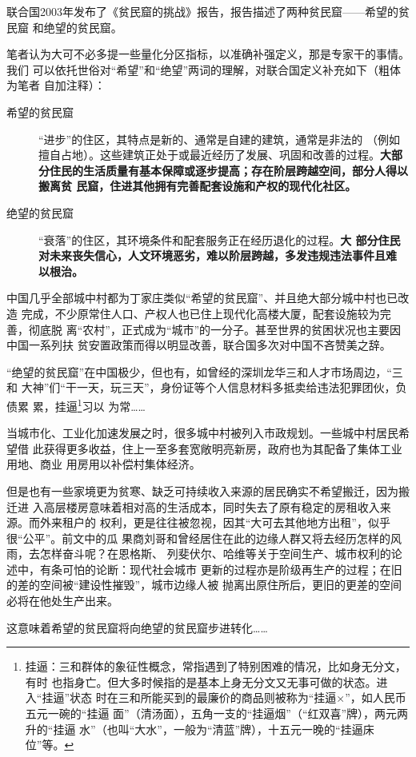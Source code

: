 联合国2003年发布了《贫民窟的挑战》报告，报告描述了两种贫民窟——希望的贫民窟
和绝望的贫民窟。

笔者认为大可不必多提一些量化分区指标，以准确补强定义，那是专家干的事情。我们
可以依托世俗对“希望”和“绝望”两词的理解，对联合国定义补充如下（粗体为笔者
自加注释）：
\begin{description}
\item[希望的贫民窟] “进步”的住区，其特点是新的、通常是自建的建筑，通常是非法的
  （例如擅自占地）。这些建筑正处于或最近经历了发展、巩固和改善的过程。\textbf{大部
    分住民的生活质量有基本保障或逐步提高；存在阶层跨越空间，部分人得以搬离贫
    民窟，住进其他拥有完善配套设施和产权的现代化社区。}
\item[绝望的贫民窟] “衰落”的住区，其环境条件和配套服务正在经历退化的过程。\textbf{大
    部分住民对未来丧失信心，人文环境恶劣，难以阶层跨越，多发违规违法事件且难
    以根治。}
\end{description}

中国几乎全部城中村都为丁家庄类似“希望的贫民窟”、并且绝大部分城中村也已改造
完成，不少原常住人口、产权人也已住上现代化高楼大厦，配套设施较为完善，彻底脱
离“农村”，正式成为“城市”的一分子。甚至世界的贫困状况也主要因中国一系列扶
贫安置政策而得以明显改善，联合国多次对中国不吝赞美之辞。

“绝望的贫民窟”在中国极少，但也有，如曾经的深圳龙华三和人才市场周边，“三和
大神”们“干一天，玩三天”，身份证等个人信息材料多抵卖给违法犯罪团伙，负债累
累，挂逼\footnote{挂逼：三和群体的象征性概念，常指遇到了特别困难的情况，比如身无分文，有时
  也指身亡。但大多时候指的是基本上身无分文又无事可做的状态。进入“挂逼”状态
  时在三和所能买到的最廉价的商品则被称为“挂逼×”，如人民币五元一碗的“挂逼
  面”（清汤面），五角一支的“挂逼烟”（“红双喜”牌），两元两升的“挂逼
  水”（也叫“大水”，一般为“清蓝”牌），十五元一晚的“挂逼床位”等。}习以
为常……


当城市化、工业化加速发展之时，很多城中村被列入市政规划。一些城中村居民希望借
此获得更多收益，住上一至多套宽敞明亮新房，政府也为其配备了集体工业用地、商业
用房用以补偿村集体经济。


但是也有一些家境更为贫寒、缺乏可持续收入来源的居民确实不希望搬迁，因为搬迁进
入高层楼房意味着相对高的生活成本，同时失去了原有稳定的房租收入来源。而外来租户的
权利，更是往往被忽视，因其“大可去其他地方出租”，似乎很“公平”。前文中的瓜
果商刘哥和曾经居住在此的边缘人群又将去经历怎样的风雨，去怎样奋斗呢？在恩格斯、
列斐伏尔、哈维等关于空间生产、城市权利的论述中，有条可怕的论断：现代社会城市
更新的过程亦是阶级再生产的过程；在旧的差的空间被“建设性摧毁”，城市边缘人被
抛离出原住所后，更旧的更差的空间必将在他处生产出来。

这意味着希望的贫民窟将向绝望的贫民窟步进转化……


